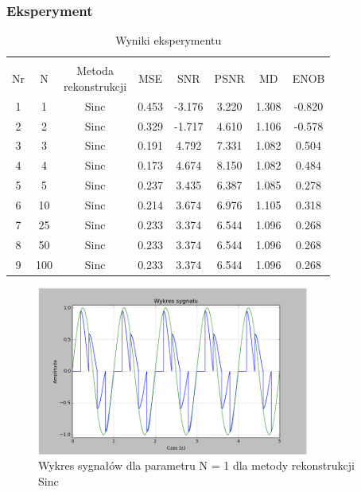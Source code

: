 \documentclass{article}
\begin{document}
    \subsubsection{Eksperyment}

    \begin{table}[h!]
        \centering
        \vspace{0.2cm}
        \begin{tabular}{|c|c|c|c|c|c|c|c|}
            \hline\hline\\[-0.4cm]
            Nr & N & \shortstack{Metoda\\ rekonstrukcji} & MSE & SNR & PSNR & MD & ENOB  \\
            \hline
            1 & 1 & Sinc & 0.453 & -3.176 & 3.220 & 1.308 & -0.820 \\
            \hline
            2 & 2 & Sinc & 0.329 & -1.717 & 4.610 & 1.106 & -0.578    \\
            \hline
            3 & 3 & Sinc & 0.191 & 4.792 & 7.331 & 1.082 & 0.504    \\
            \hline
            4 & 4 & Sinc & 0.173 & 4.674 & 8.150 & 1.082 & 0.484  \\
            \hline
            5 & 5 & Sinc & 0.237 & 3.435 & 6.387 & 1.085 & 0.278    \\
            \hline
            6 & 10 & Sinc & 0.214 & 3.674 & 6.976 & 1.105 & 0.318   \\
            \hline
            7 & 25 & Sinc & 0.233 & 3.374 & 6.544 & 1.096 & 0.268   \\
            \hline
            8 & 50 & Sinc & 0.233 & 3.374 & 6.544 & 1.096 & 0.268   \\
            \hline
            9 & 100 & Sinc & 0.233 & 3.374 & 6.544 & 1.096 & 0.268  \\
            \hline
        \end{tabular}
        \caption{Wyniki eksperymentu}
    \end{table}
    \FloatBarrier

    \begin{figure}[h!]
        \centering
        \includegraphics[width=0.8\textwidth]{img/1/sinc1.png}
        \caption{Wykres sygnałów dla parametru N = 1 dla metody rekonstrukcji Sinc}
    \end{figure}
    \FloatBarrier
\end{document}
